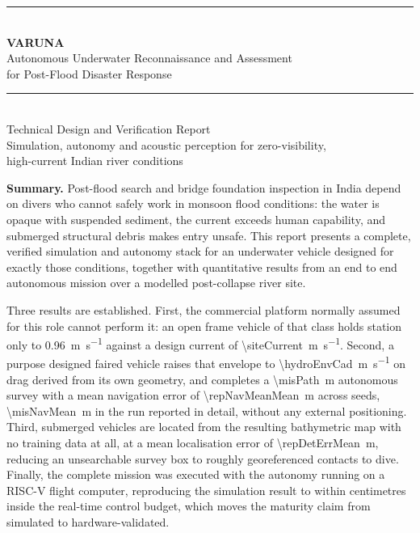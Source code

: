 \documentclass[10pt,a4paper]{article}
\begin{document}
\begin{titlepage}
\centering
\vspace*{0.35cm}
{\color{accent}\rule{\linewidth}{1.2pt}}\\[4mm]
{\Huge\bfseries VARUNA}\\[3mm]
{\Large Autonomous Underwater Reconnaissance and Assessment\\ for Post-Flood Disaster Response}\\[2mm]
{\color{accent}\rule{\linewidth}{1.2pt}}\\[6mm]

{\large Technical Design and Verification Report}\\[3mm]
{\normalsize Simulation, autonomy and acoustic perception for zero-visibility,\\ high-current Indian river conditions}\\[8mm]

\begin{minipage}{0.86\linewidth}
\small
\textbf{Summary.} Post-flood search and bridge foundation inspection in India
depend on divers who cannot safely work in monsoon flood conditions: the water
is opaque with suspended sediment, the current exceeds human capability, and
submerged structural debris makes entry unsafe. This report presents a
complete, verified simulation and autonomy stack for an underwater vehicle
designed for exactly those conditions, together with quantitative results from
an end to end autonomous mission over a modelled post-collapse river site.

Three results are established. First, the commercial platform normally assumed
for this role cannot perform it: an open frame vehicle of that class holds
station only to \SI{0.96}{\metre\per\second} against a design current of
\SI{\siteCurrent}{\metre\per\second}. Second, a purpose designed faired
vehicle raises that envelope to \SI{\hydroEnvCad}{\metre\per\second} on drag
derived from its own geometry, and completes a \SI{\misPath}{\metre} autonomous
survey with a mean navigation error of \SI{\repNavMeanMean}{\metre} across
\repRuns{} seeds, \SI{\misNavMean}{\metre} in the run reported in detail, without any
external positioning. Third,
submerged vehicles are located from the resulting bathymetric map with no
training data at all, at a mean localisation error of
\SI{\repDetErrMean}{\metre}, reducing an unsearchable survey box to roughly
\detContacts{} georeferenced contacts to dive. Finally, the complete mission was executed with the
autonomy running on a RISC-V flight computer, reproducing the simulation result
to within centimetres inside the real-time control budget, which moves the
maturity claim from simulated to hardware-validated.
\end{minipage}


\end{titlepage}
\end{document}
